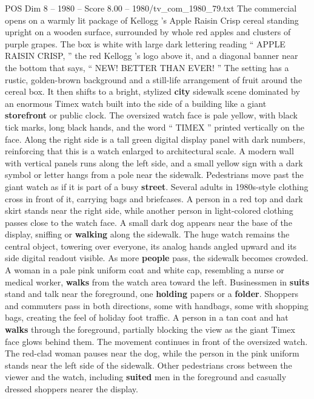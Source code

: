 \begin{textsample}{POS Dim 8 – 1980 – Score 8.00 – 1980/tv\_com\_1980\_79.txt}  \label{ex:f8_pos_044}
The commercial opens on a warmly lit package of Kellogg ’s Apple Raisin Crisp cereal standing upright on a wooden surface, surrounded by whole red apples and clusters of purple grapes.
The box is white with large dark lettering reading “ APPLE RAISIN CRISP, ” the red Kellogg ’s logo above it, and a diagonal banner near the bottom that says, “ NEW!
BETTER THAN EVER! ” The setting has a rustic, golden-brown background and a still-life arrangement of fruit around the cereal box.
It then shifts to a bright, stylized \textbf{city} sidewalk scene dominated by an enormous Timex watch built into the side of a building like a giant \textbf{storefront} or public clock.
The oversized watch face is pale yellow, with black tick marks, long black hands, and the word “ TIMEX ” printed vertically on the face.
Along the right side is a tall green digital display panel with dark numbers, reinforcing that this is a watch enlarged to architectural scale.
A modern wall with vertical panels runs along the left side, and a small yellow sign with a dark symbol or letter hangs from a pole near the sidewalk.
Pedestrians move past the giant watch as if it is part of a busy \textbf{street}.
Several adults in 1980s-style clothing cross in front of it, carrying bags and briefcases.
A person in a red top and dark skirt stands near the right side, while another person in light-colored clothing passes close to the watch face.
A small dark dog appears near the base of the display, sniffing or \textbf{walking} along the sidewalk.
The huge watch remains the central object, towering over everyone, its analog hands angled upward and its side digital readout visible.
As more \textbf{people} pass, the sidewalk becomes crowded.
A woman in a pale pink uniform coat and white cap, resembling a nurse or medical worker, \textbf{walks} from the watch area toward the left.
Businessmen in \textbf{suits} stand and talk near the foreground, one \textbf{holding} papers or a \textbf{folder}.
Shoppers and commuters pass in both directions, some with handbags, some with shopping bags, creating the feel of holiday foot traffic.
A person in a tan coat and hat \textbf{walks} through the foreground, partially blocking the view as the giant Timex face glows behind them.
The movement continues in front of the oversized watch.
The red-clad woman pauses near the dog, while the person in the pink uniform stands near the left side of the sidewalk.
Other pedestrians cross between the viewer and the watch, including \textbf{suited} men in the foreground and casually dressed shoppers nearer the display.

\end{textsample}
